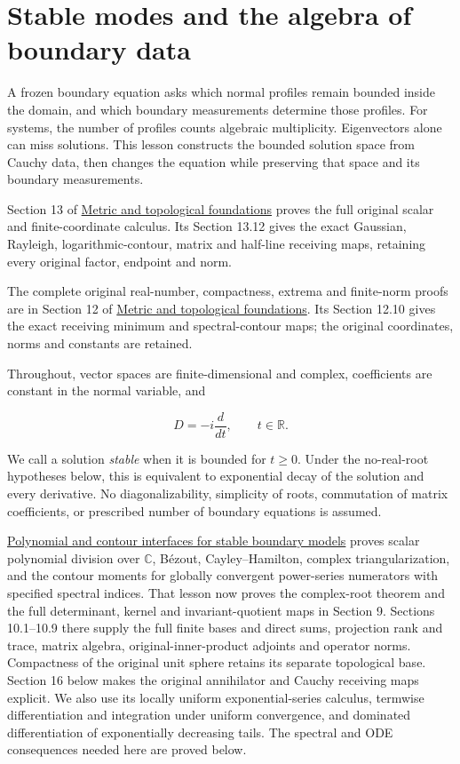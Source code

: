 \documentclass[
  11pt,
]{article}
\author{}
\date{}
\begin{document}
\section{Stable modes and the algebra of boundary
data}\label{stable-modes-and-the-algebra-of-boundary-data}

A frozen boundary equation asks which normal profiles remain bounded
inside the domain, and which boundary measurements determine those
profiles. For systems, the number of profiles counts algebraic
multiplicity. Eigenvectors alone can miss solutions. This lesson
constructs the bounded solution space from Cauchy data, then changes the
equation while preserving that space and its boundary measurements.

Section 13 of
\href{metric-foundation-bridges.pdf\#section*.74}{Metric
and topological foundations} proves the full original scalar and
finite-coordinate calculus. Its Section 13.12 gives the exact Gaussian,
Rayleigh, logarithmic-contour, matrix and half-line receiving maps,
retaining every original factor, endpoint and norm.

The complete original real-number, compactness, extrema and finite-norm
proofs are in Section 12 of
\href{metric-foundation-bridges.pdf\#section*.13}{Metric
and topological foundations}. Its Section 12.10 gives the exact
receiving minimum and spectral-contour maps; the original coordinates,
norms and constants are retained.

Throughout, vector spaces are finite-dimensional and complex,
coefficients are constant in the normal variable, and

\[
D=-i\frac{d}{dt},\qquad t\in\mathbb R.
\]

We call a solution \emph{stable} when it is bounded for \(t\geq0\).
Under the no-real-root hypotheses below, this is equivalent to
exponential decay of the solution and every derivative. No
diagonalizability, simplicity of roots, commutation of matrix
coefficients, or prescribed number of boundary equations is assumed.

\href{stable-prerequisite-bridges.pdf}{Polynomial and contour interfaces
for stable boundary models} proves scalar polynomial division over
\(\mathbb C\), Bézout, Cayley--Hamilton, complex triangularization, and
the contour moments for globally convergent power-series numerators with
specified spectral indices. That lesson now proves the complex-root
theorem and the full determinant, kernel and invariant-quotient maps in
Section 9. Sections 10.1--10.9 there supply the full finite bases and
direct sums, projection rank and trace, matrix algebra,
original-inner-product adjoints and operator norms. Compactness of the
original unit sphere retains its separate topological base. Section 16
below makes the original annihilator and Cauchy receiving maps explicit.
We also use its locally uniform exponential-series calculus, termwise
differentiation and integration under uniform convergence, and dominated
differentiation of exponentially decreasing tails. The spectral and ODE
consequences needed here are proved below.
\end{document}
